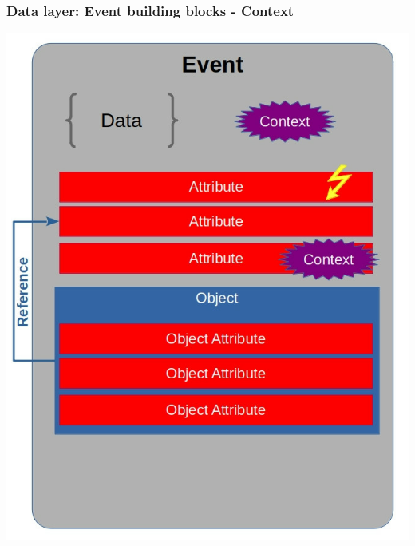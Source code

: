 \begin{frame}
    \frametitle{Data layer: Event building blocks - Context}
        \begin{center}
            \includegraphics[scale=0.33]{screenshots/event-building-blocks/event-attribute-object-context.png}
        \end{center}
\end{frame}

